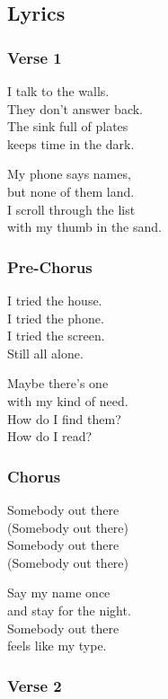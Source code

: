 \subsection{Lyrics}\label{lyrics-8}

\subsubsection{Verse 1}\label{verse-1-5}

I talk to the walls.\\
They don't answer back.\\
The sink full of plates\\
keeps time in the dark.

My phone says names,\\
but none of them land.\\
I scroll through the list\\
with my thumb in the sand.

\subsubsection{Pre-Chorus}\label{pre-chorus-6}

I tried the house.\\
I tried the phone.\\
I tried the screen.\\
Still all alone.

Maybe there's one\\
with my kind of need.\\
How do I find them?\\
How do I read?

\subsubsection{Chorus}\label{chorus-14}

Somebody out there\\
(Somebody out there)\\
Somebody out there\\
(Somebody out there)

Say my name once\\
and stay for the night.\\
Somebody out there\\
feels like my type.

\subsubsection{Verse 2}\label{verse-2-5}

